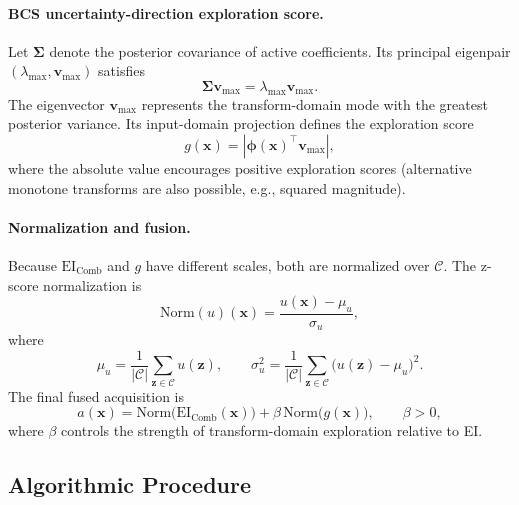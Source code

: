 \documentclass[lettersize,journal]{IEEEtran}
\begin{document}
\paragraph{BCS uncertainty-direction exploration score.}
Let $\mathbf{\Sigma}$ denote the posterior covariance of active coefficients. Its principal eigenpair $(\lambda_{\max},\mathbf{v}_{\max})$ satisfies
\begin{equation}
\label{eq:eig}
\mathbf{\Sigma}\mathbf{v}_{\max}=\lambda_{\max}\mathbf{v}_{\max}.
\end{equation}
The eigenvector $\mathbf{v}_{\max}$ represents the transform-domain mode with the greatest posterior variance. Its input-domain projection defines the exploration score
\begin{equation}
\label{eq:g_def}
g(\mathbf{x}) = \left|\boldsymbol{\phi}(\mathbf{x})^\top \mathbf{v}_{\max}\right|,
\end{equation}
where the absolute value encourages positive exploration scores (alternative monotone transforms are also possible, e.g., squared magnitude).

\paragraph{Normalization and fusion.}
Because $\mathrm{EI}_{\mathrm{Comb}}$ and $g$ have different scales, both are normalized over $\mathcal{C}$. The z-score normalization is
\begin{equation}
\label{eq:norm}
\mathrm{Norm}(u)(\mathbf{x})
=\frac{u(\mathbf{x})-\mu_u}{\sigma_u},
\end{equation}
where
\begin{equation}
\label{eq:norm_stats}
\mu_u=\frac{1}{|\mathcal{C}|}\sum_{\mathbf{z}\in\mathcal{C}}u(\mathbf{z}),
\qquad
\sigma_u^2=\frac{1}{|\mathcal{C}|}\sum_{\mathbf{z}\in\mathcal{C}}\bigl(u(\mathbf{z})-\mu_u\bigr)^2.
\end{equation}
The final fused acquisition is
\begin{equation}
\label{eq:fused_acq}
a(\mathbf{x})
=
\mathrm{Norm}\!\bigl(\mathrm{EI}_{\mathrm{Comb}}(\mathbf{x})\bigr)
+\beta\,\mathrm{Norm}\!\bigl(g(\mathbf{x})\bigr),
\qquad \beta>0,
\end{equation}
where $\beta$ controls the strength of transform-domain exploration relative to EI.

\subsection{Algorithmic Procedure}
\label{subsec:procedure}
\end{document}
